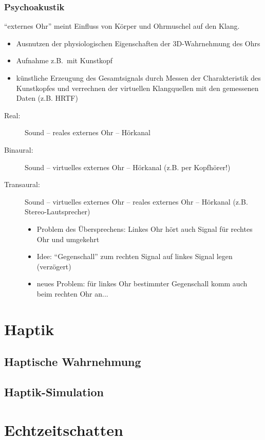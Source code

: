 \documentclass[a4paper, 12pt]{article}
\begin{document}
\subsubsection*{Psychoakustik}
``externes Ohr'' meint Einfluss von Körper und Ohrmuschel auf den Klang.
\begin{itemize}
  \item Ausnutzen der physiologischen Eigenschaften der 3D-Wahrnehmung des Ohrs
  \item Aufnahme z.B.\ mit Kunstkopf
  \item künstliche Erzeugung des Gesamtsignals durch Messen der Charakteristik des Kunstkopfes und verrechnen der virtuellen Klangquellen mit den gemessenen Daten (z.B. HRTF)
\end{itemize}
\begin{description}
  \item[Real:] Sound -- reales externes Ohr -- Hörkanal
  \item[Binaural:] Sound -- virtuelles externes Ohr -- Hörkanal (z.B. per Kopfhörer!)
  \item[Transaural:] Sound -- virtuelles externes Ohr -- reales externes Ohr -- Hörkanal (z.B. Stereo-Lautsprecher)
    \begin{itemize}
      \item Problem des Übersprechens: Linkes Ohr hört auch Signal für rechtes Ohr und umgekehrt
      \item Idee: ``Gegenschall'' zum rechten Signal auf linkes Signal legen (verzögert)
      \item neues Problem: für linkes Ohr bestimmter Gegenschall komm auch beim rechten Ohr an...
    \end{itemize}
\end{description}



\section{Haptik}


\subsection[Wahrnehmung]{Haptische Wahrnehmung}


\subsection[Simulation]{Haptik-Simulation}



\section{Echtzeitschatten}
\end{document}
